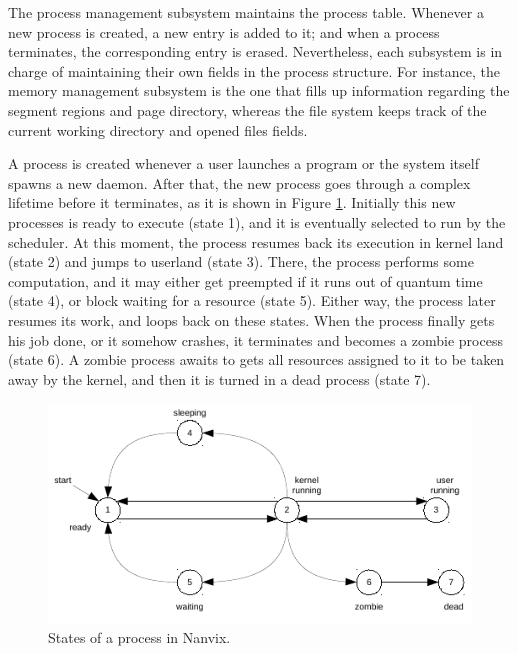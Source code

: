 \documentclass[10pt,a4paper]{article}
\begin{document}
\begin{table}[h]
\begin{tabular}{l l l}
	\bottomrule
\end{tabular}
\end{table}

The process management subsystem maintains the process table. Whenever a new process is created, a new entry is added to it; and when a process terminates, the corresponding entry is erased. Nevertheless, each subsystem is in charge of maintaining their own fields in the process structure. For instance, the memory management subsystem is the one that fills up information regarding the segment regions and page directory, whereas the file system keeps track of the current working directory and opened files fields.

A process is created whenever a user launches a program or the system itself spawns a new daemon. After that, the new process goes through a complex lifetime before it terminates, as it is shown in Figure \ref{figure: states of a process in nanvix}. Initially this new processes is ready to execute (state 1), and it is eventually selected to run by the scheduler. At this moment, the process resumes back its execution in kernel land (state 2) and jumps to userland (state 3). There, the process performs some computation, and it may either get preempted if it runs out of quantum time (state 4), or block waiting for a resource (state 5). Either way, the process later resumes its work, and loops back on these states. When the process finally gets his job done, or it somehow crashes, it terminates and becomes a zombie process (state 6). A zombie process awaits to gets all resources assigned to it to be taken away by the kernel, and then it is turned in a dead process (state 7).

\begin{figure}[t]
	\centering
	\includegraphics[scale=1.4]{img/process-states}
	\caption{States of a process in Nanvix.}
	\label{figure: states of a process in nanvix}
\end{figure}
\end{document}
